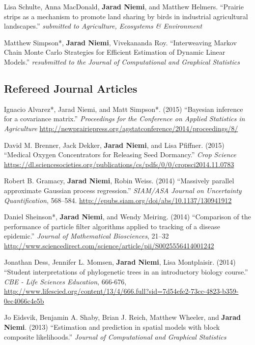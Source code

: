 \documentclass[overlapped,line]{res}
\begin{document}
\begin{resume}
Lisa Schulte, Anna MacDonald, {\bf Jarad Niemi}, and Matthew Helmers. ``Prairie strips as a mechanism to promote land sharing by birds in industrial agricultural landscapes.'' \emph{submitted to Agriculture, Ecosystems \& Environment}

Matthew Simpson*, {\bf Jarad Niemi}, Vivekananda Roy. ``Interweaving Markov Chain Monte Carlo Strategies for Efficient Estimation of Dynamic Linear Models.'' \emph{resubmitted to the Journal of Computational and Graphical Statistics}

\subsection{\bf Refereed Journal Articles}

Ignacio Alvarez*, Jarad Niemi, and Matt Simpson*. (2015) ``Bayesian inference for a covariance matrix.'' \emph{Proceedings for the Conference on Applied Statistics in Agriculture} \url{http://newprairiepress.org/agstatconference/2014/proceedings/8/}

David M. Brenner, Jack Dekker, {\bf Jarad Niemi}, and Lisa Pfiffner. (2015) ``Medical Oxygen Concentrators for Releasing Seed Dormancy.'' \emph{Crop Science} \url{https://dl.sciencesocieties.org/publications/cs/pdfs/0/0/cropsci2014.11.0783}

Robert B. Gramacy, {\bf Jarad Niemi}, Robin Weiss. (2014) ``Massively parallel approximate Gaussian process regression.'' \emph{SIAM/ASA Journal on Uncertainty Quantification}, 568--584. \url{http://epubs.siam.org/doi/abs/10.1137/130941912}

Daniel Sheinson*, {\bf Jarad Niemi}, and Wendy Meiring. (2014) ``Comparison of the performance of particle filter algorithms applied to tracking of a disease epidemic.'' \emph{Journal of Mathematical Biosciences}, 21--32 \url{http://www.sciencedirect.com/science/article/pii/S0025556414001242}

Jonathan Dess, Jennifer L. Momsen, {\bf Jarad Niemi}, Lisa Montplaisir. (2014) ``Student interpretations of phylogenetic trees in an introductory biology course.'' \emph{CBE - Life Sciences Education}, 666-676, \url{http://www.lifescied.org/content/13/4/666.full?sid=7d54efe2-73cc-4823-b359-0ec4066c4e5b}

Jo Eidsvik, Benjamin A. Shaby, Brian J. Reich, Matthew Wheeler, and {\bf Jarad Niemi}. (2013) ``Estimation and prediction in spatial models with block composite likelihoods.'' \emph{Journal of Computational and Graphical Statistics}


\end{resume}
\end{document}
